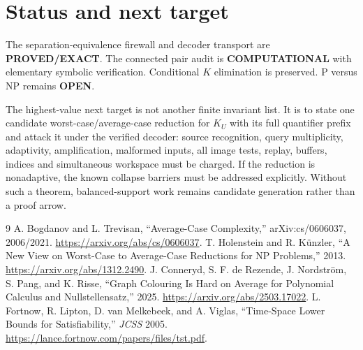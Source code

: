 \documentclass[11pt]{article}
\newcommand{\KU}{K_U}
\newcommand{\EXACT}{\textbf{PROVED/EXACT}}
\newcommand{\COMP}{\textbf{COMPUTATIONAL}}
\newcommand{\OPEN}{\textbf{OPEN}}
\begin{document}
\section{Status and next target}
The separation-equivalence firewall and decoder transport are \EXACT.  The
connected pair audit is \COMP{} with elementary symbolic verification.
Conditional $K$ elimination is preserved.  P versus NP remains \OPEN.

The highest-value next target is not another finite invariant list.  It is
to state one candidate worst-case/average-case reduction for $\KU$ with its
full quantifier prefix and attack it under the verified decoder: source
recognition, query multiplicity, adaptivity, amplification, malformed inputs,
all image tests, replay, buffers, indices and simultaneous workspace must be
charged.  If the reduction is nonadaptive, the known collapse barriers must
be addressed explicitly.  Without such a theorem, balanced-support work
remains candidate generation rather than a proof arrow.

\begin{thebibliography}{9}
 A. Bogdanov and L. Trevisan, ``Average-Case Complexity,''
arXiv:cs/0606037, 2006/2021. \url{https://arxiv.org/abs/cs/0606037}.
 T. Holenstein and R. K\"unzler, ``A New View on Worst-Case to
Average-Case Reductions for NP Problems,'' 2013.
\url{https://arxiv.org/abs/1312.2490}.
 J. Conneryd, S. F. de Rezende, J. Nordstr\"om, S. Pang,
and K. Risse, ``Graph Colouring Is Hard on Average for Polynomial Calculus
and Nullstellensatz,'' 2025. \url{https://arxiv.org/abs/2503.17022}.
 L. Fortnow, R. Lipton, D. van Melkebeek, and A. Viglas,
``Time-Space Lower Bounds for Satisfiability,'' \emph{JCSS} 2005.
\url{https://lance.fortnow.com/papers/files/tst.pdf}.
\end{thebibliography}

\end{document}
